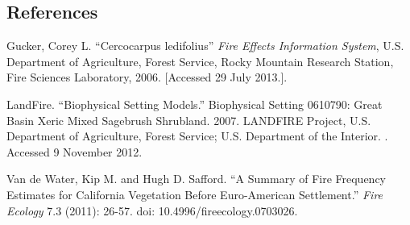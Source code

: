 \subsection*{References}
\begin{hangparas}{.25in}{1} 
Gucker, Corey L. ``Cercocarpus ledifolius'' \emph{Fire Effects Information System}, U.S. Department of Agriculture, Forest Service, Rocky Mountain Research Station, Fire Sciences Laboratory, 2006.   [Accessed 29 July 2013.]. 

LandFire. ``Biophysical Setting Models.'' Biophysical Setting 0610790: Great Basin Xeric Mixed Sagebrush Shrubland. 2007. LANDFIRE Project, U.S. Department of Agriculture, Forest Service; U.S. Department of the Interior. . Accessed 9 November 2012.

Van de Water, Kip M. and Hugh D. Safford. ``A Summary of Fire Frequency Estimates for California Vegetation Before Euro-American Settlement.'' \emph{Fire Ecology} 7.3 (2011): 26-57. doi: 10.4996/fireecology.0703026.

\end{hangparas}

